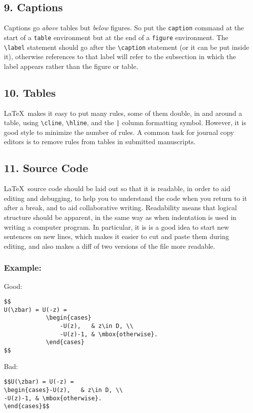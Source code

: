 \documentclass[12pt]{extarticle}
\begin{document}
\subsection*{9. Captions}
\label{sec-1-9}
Captions go \emph{above} tables but \emph{below} figures.
So put the \texttt{caption} command at the start of a \texttt{table} environment but at
the end of a \texttt{figure} environment.
The \texttt{\textbackslash{}label} statement should go after the \texttt{\textbackslash{}caption} statement
(or it can be put inside it), otherwise references to that label will refer
to the subsection in which the label appears rather than the figure or table.

\subsection*{10. Tables}
\label{sec-1-10}
\LaTeX\ makes it easy to put many rules, some of them double, 
in and around a table,
using 
\texttt{\textbackslash{}cline}, \texttt{\textbackslash{}hline}, and the \texttt{|} column formatting symbol.
However, it is good style to minimize the number of rules.
A common task for journal copy editors is to remove rules from tables in 
submitted manuscripts.

\subsection*{11. Source Code}
\label{sec-1-11}
\LaTeX\ source code should be laid out so that it is readable, in order to
aid editing and debugging, to help you to understand the code when you return
to it after a break, and to aid collaborative writing.
Readability means that logical structure should be apparent,
in the same way as when indentation is used in writing a computer program.
In particular, it is is a good idea 
to start new sentences on new lines, which makes it easier to cut
and paste them during editing,
and also makes a diff of two versions of the file more readable.

\subsubsection*{Example:}
\label{sec-1-11-1}

Good:
\begin{verbatim}
$$
U(\zbar) = U(-z) = 
            \begin{cases}
                -U(z),   & z\in D, \\ 
                -U(z)-1, & \mbox{otherwise}.
            \end{cases}
$$
\end{verbatim}
Bad:
\begin{verbatim}
$$U(\zbar) = U(-z) = 
\begin{cases}-U(z),   & z\in D, \\ 
-U(z)-1, & \mbox{otherwise}.
\end{cases}$$
\end{verbatim}
\end{document}
